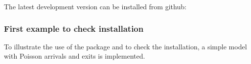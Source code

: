 The latest development version can be installed from github:

\begin{Shaded}
\begin{Highlighting}[]
\OperatorTok{::}\NormalTok{(}\NormalTok{)}
\end{Highlighting}
\end{Shaded}

\hypertarget{first-example-to-check-installation}{%
\subsubsection{First example to check installation}\label{first-example-to-check-installation}}

To illustrate the use of the package and to check the installation, a simple model with Poisson arrivals and exits is implemented.

\begin{Shaded}
\begin{Highlighting}[]

\StringTok{ }
\StringTok{ }\NormalTok{(} \NormalTok{(} \NormalTok{)}

\StringTok{ }\NormalTok{(} \NormalTok{, } \NormalTok{)}
\StringTok{ }\NormalTok{(} \NormalTok{, } \NormalTok{)}
\StringTok{ }\NormalTok{(}\NormalTok{ =}\StringTok{ }\NormalTok{, }\NormalTok{ =}\StringTok{ }\NormalTok{)}

\StringTok{ }\NormalTok{(} 
\end{Highlighting}
\end{Shaded}

